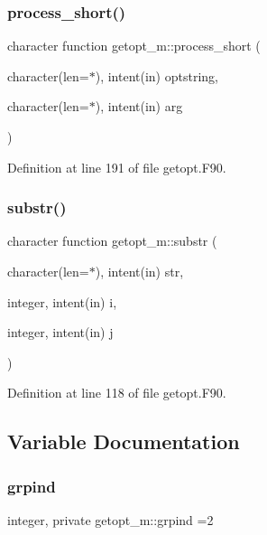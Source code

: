 \subsubsection{\texorpdfstring{process\+\_\+short()}{process\_short()}}
{\footnotesize\ttfamily character function getopt\+\_\+m\+::process\+\_\+short (\begin{DoxyParamCaption}\item[{character(len=$\ast$), intent(in)}]{optstring,  }\item[{character(len=$\ast$), intent(in)}]{arg }\end{DoxyParamCaption})}



Definition at line 191 of file getopt.\+F90.

\mbox{\label{namespacegetopt__m_ab200fe1febc0e4b17c955268176647e8}} 
\subsubsection{\texorpdfstring{substr()}{substr()}}
{\footnotesize\ttfamily character function getopt\+\_\+m\+::substr (\begin{DoxyParamCaption}\item[{character(len=$\ast$), intent(in)}]{str,  }\item[{integer, intent(in)}]{i,  }\item[{integer, intent(in)}]{j }\end{DoxyParamCaption})}



Definition at line 118 of file getopt.\+F90.



\subsection{Variable Documentation}
\mbox{\label{namespacegetopt__m_a3579bc0473009d7fd52a77dc7df5e6b5}} 
\subsubsection{\texorpdfstring{grpind}{grpind}}
{\footnotesize\ttfamily integer, private getopt\+\_\+m\+::grpind =2\hspace{0.3cm}{\ttfamily [private]}}



